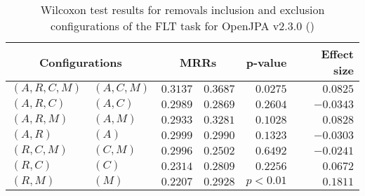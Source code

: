 
\begin{table}
\begin{spacing}{1.2}
\centering
\caption{Wilcoxon test results for removals inclusion and exclusion configurations of the FLT task for OpenJPA v2.3.0 (\ctwo)}
\label{table:versus-wilcox-openjpa-flt-removals}
\begin{tabular}{ll|rr|rr}
\toprule
      \multicolumn{2}{c|}{Configurations} &                \multicolumn{2}{c|}{MRRs} &             p-value & Effect size \\
\midrule
 $(A,R,C,M)$ &  $(A,C,M)$ &       $0.3137$ &  $\bm{0.3687}$ & $0.0275$ &    $0.0825$ \\
   $(A,R,C)$ &    $(A,C)$ &  $\bm{0.2989}$ &       $0.2869$ & $0.2604$ &   $-0.0343$ \\
   $(A,R,M)$ &    $(A,M)$ &       $0.2933$ &  $\bm{0.3281}$ & $0.1028$ &    $0.0828$ \\
     $(A,R)$ &      $(A)$ &  $\bm{0.2999}$ &       $0.2990$ & $0.1323$ &   $-0.0303$ \\
   $(R,C,M)$ &    $(C,M)$ &  $\bm{0.2996}$ &       $0.2502$ & $0.6492$ &   $-0.0241$ \\
     $(R,C)$ &      $(C)$ &       $0.2314$ &  $\bm{0.2809}$ & $0.2256$ &    $0.0672$ \\
     $(R,M)$ &      $(M)$ &       $0.2207$ &  $\bm{0.2928}$ & $p<0.01$ &    $0.1811$ \\
\bottomrule
\end{tabular}

\end{spacing}
\end{table}

